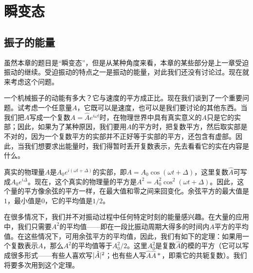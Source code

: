 \chapter{瞬变态}

\section{振子的能量}

虽然本章的题目是“瞬变态”，但是从某种角度来看，本章的某些部分是上一章受迫振动的继续。受迫振动的特点之一是振动的能量，对此我们还没有讨论过。现在就来考虑这个问题。

一个机械振子的动能有多大？它与速度的平方成正比。现在我们谈到了一个重要问题。试考虑一个任意量$A$，它既可以是速度，也可以是我们要讨论的其他东西。当我们把$A$写成一个复数$A=\hat{A}e^{i\omega t}$时，在物理世界中具有真实意义的$A$只是它的实部；因此，如果为了某种原因，我们要用$A$的平方时，把复数平方，然后取实部是不对的，因为一个复数平方的实部并不正好等于实部的平方，还包含有虚部。因此，当我们想要求出能量时，我们得暂时丢开复数表示，先去看看它的实在内容是什么。

真实的物理量$A$是$A_0e^{i(\omega t+\Delta)}$的实部，即$A=A_0\cos(\omega t+\Delta)$，这里复数$\hat{A}$可写成$A_0e^{i\Delta}$。现在，这个真实的物理量的平方是$A^2=A_0^2\cos^2(\omega t + \Delta)$。因此，这个量的平方像余弦的平方一样，在最大值和零之间来回变化。余弦平方的最大值是$1$，最小值是$0$，它的平均值是$1/2$。

在很多情况下，我们并不对振动过程中任何特定时刻的能量感兴趣。在大量的应用中，我们只需要$A^2$的平均值——即在一段比振动周期大得多的时间内$A$平方的平均值。在这些情况下，可用余弦平方的平均值，因此，我们有如下的定理：如果用一个复数表示$A$，那么$A^2$的平均值等于$A^2_0/2$。这里$A_0^2$是复数$\hat{A}$的模的平方（它可以写成很多形式——有些人喜欢写$\lvert\hat{A}\rvert^2$；也有些人写$\hat{A}\hat{A}*$，即乘它的共轭复数）。我们将要多次用到这个定理。

